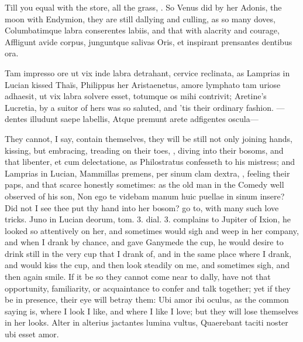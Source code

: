 Till you equal with the store, all the grass, \etc{}. So Venus did by her
Adonis, the moon with Endymion, they are still dallying and culling, as
so many doves, Columbatimque labra conserentes labiis, and that with
alacrity and courage,
Affligunt avide corpus, junguntque salivas
Oris, et inspirant prensantes dentibus ora.

Tam impresso ore ut vix inde labra detrahant, cervice reclinata,
as Lamprias in Lucian kissed Thaïs, Philippus her Aristaenetus,
amore lymphato tam uriose adhaesit, ut vix labra solvere esset,
totumque os mihi contrivit; Aretine's Lucretia, by a suitor of
hers was so saluted, and 'tis their ordinary fashion.
---dentes illudunt saepe labellis,
Atque premunt arete adfigentes oscula---

They cannot, I say, contain themselves, they will be still not only
joining hands, kissing, but embracing, treading on their toes, \etc{},
diving into their bosoms, and that libenter, et cum delectatione, as
 Philostratus confesseth to his mistress; and Lamprias in Lucian,
Mammillas premens, per sinum clam dextra, \etc{}, feeling their paps, and
that scarce honestly sometimes: as the old man in the Comedy well
observed of his son, Non ego te videbam manum huic puellae in sinum
insere? Did not I see thee put thy hand into her bosom? go to, with
many such love tricks. Juno in Lucian deorum, tom. 3. dial. 3.
complains to Jupiter of Ixion, he looked so attentively on her,
and sometimes would sigh and weep in her company, and when I drank by
chance, and gave Ganymede the cup, he would desire to drink still in
the very cup that I drank of, and in the same place where I drank, and
would kiss the cup, and then look steadily on me, and sometimes sigh,
and then again smile. If it be so they cannot come near to dally, have
not that opportunity, familiarity, or acquaintance to confer and talk
together; yet if they be in presence, their eye will betray them: Ubi
amor ibi oculus, as the common saying is, where I look I like, and
where I like I love; but they will lose themselves in her looks.
Alter in alterius jactantes lumina vultus,
Quaerebant taciti noster ubi esset amor.

